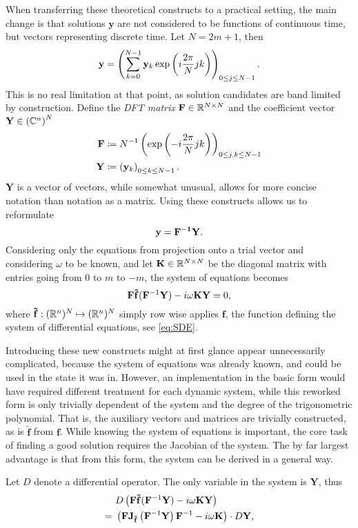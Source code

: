 When transferring these theoretical constructs to a practical setting, the main change is that solutions $\mathbf{y}$ are not considered to be functions of continuous time, but vectors representing discrete time.
Let $N = 2m+1$, then
	\[
		\mathbf{\mathbf{y}} = \left( \sum_{k=0}^{N-1} \mathbf{y}_k \exp\left(i \frac{2\pi}{N} j k\right) \right)_{0 \le j \le N-1} \text.
	\]
This is no real limitation at that point, as solution candidates are band limited by construction.
Define the \emph{DFT matrix} $\mathbf F \in \mathbb{R}^{N \times N}$ and the coefficient vector $\mathbf Y \in \left(\mathbb{C}^n\right)^N$
	\begin{align*}
		\mathbf{F} &\coloneqq N^{-1} \left( \exp\left(-i \frac{2\pi}{N} j k \right) \right)_{0 \le j,k \le N-1} \\
		\mathbf{Y} &\coloneqq \left(\mathbf{y}_k\right)_{0 \le k \le N-1} \text.
	\end{align*}
$\mathbf Y$ is a vector of vectors, while somewhat unusual, allows for more concise notation than notation as a matrix.
Using these constructs allows us to reformulate
	\[
			\mathbf{y} = \mathbf{F^{-1}} \mathbf{Y} \text.
	\]
Considering only the equations from projection onto a trial vector and considering $\omega$ to be known, and let $\mathbf K \in \mathbb{R}^{N \times N}$ be the diagonal matrix with entries going from $0$ to $m$ to $-m$, the system of equations becomes %
	\[
		\mathbf{F} \mathbf{\tilde f}(\mathbf F^{-1} \mathbf{Y}) - i \omega \mathbf K \mathbf Y = 0\text,
	\]
where $\mathbf{\tilde f}: (\mathbb{R}^n)^N \mapsto (\mathbb{R}^n)^N$ simply row wise applies $\mathbf{f}$, the function defining the system of differential equations, see \autoref{eq:SDE}.

Introducing these new constructs might at first glance appear unnecessarily complicated, because the system of equations was already known, and could be used in the state it was in.
However, an implementation in the basic form would have required different treatment for each dynamic system, while this reworked form is only trivially dependent of the system and the degree of the trigonometric polynomial.
That is, the auxiliary vectors and matrices are trivially constructed, as is $\mathbf{\tilde f}$ from $\mathbf f$.
While knowing the system of equations is important, the core task of finding a good solution requires the Jacobian of the system.
The by far largest advantage is that from this form, the system can be derived in a general way.

Let $D$ denote a differential operator.
The only variable in the system is $\mathbf Y$, thus
	\begin{align}
			& D \left( \mathbf{F} \mathbf{\tilde f}(\mathbf{F}^{-1} \mathbf{Y}) - i \omega \mathbf K \mathbf Y \right) \nonumber \\
		=\ & \left(\mathbf{F} \mathbf J_{\mathbf{\tilde f}} \left( \mathbf{F}^{-1} \mathbf{Y} \right) \mathbf{F}^{-1} - i \omega \mathbf K \right) \cdot D \mathbf Y \label{eq:vecsys}\text,
	\end{align}
	

